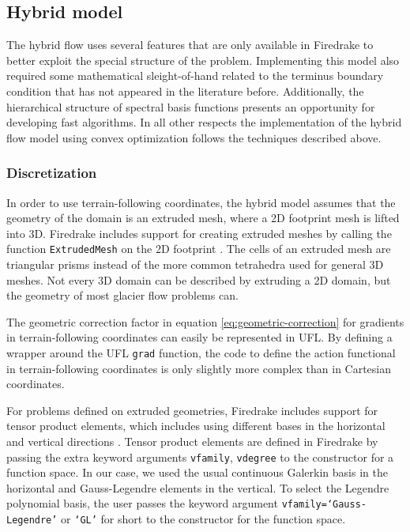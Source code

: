 \documentclass[journal abbreviation, manuscript]{copernicus}
\begin{document}
\subsection{Hybrid model}

The hybrid flow uses several features that are only available in Firedrake to better exploit the special structure of the problem.
Implementing this model also required some mathematical sleight-of-hand related to the terminus boundary condition that has not appeared in the literature before.
Additionally, the hierarchical structure of spectral basis functions presents an opportunity for developing fast algorithms.
In all other respects the implementation of the hybrid flow model using convex optimization follows the techniques described above.

\subsubsection{Discretization}

In order to use terrain-following coordinates, the hybrid model assumes that the geometry of the domain is an extruded mesh, where a 2D footprint mesh is lifted into 3D.
Firedrake includes support for creating extruded meshes by calling the function \texttt{ExtrudedMesh} on the 2D footprint \citep{bercea2016structure, mcrae2016automated}.
The cells of an extruded mesh are triangular prisms instead of the more common tetrahedra used for general 3D meshes.
Not every 3D domain can be described by extruding a 2D domain, but the geometry of most glacier flow problems can.

The geometric correction factor in equation \eqref{eq:geometric-correction} for gradients in terrain-following coordinates can easily be represented in UFL.
By defining a wrapper around the UFL \texttt{grad} function, the code to define the action functional in terrain-following coordinates is only slightly more complex than in Cartesian coordinates.

For problems defined on extruded geometries, Firedrake includes support for tensor product elements, which includes using different bases in the horizontal and vertical directions \citep{mcrae2016automated}.
Tensor product elements are defined in Firedrake by passing the extra keyword arguments \texttt{vfamily}, \texttt{vdegree} to the constructor for a function space.
In our case, we used the usual continuous Galerkin basis in the horizontal and Gauss-Legendre elements in the vertical.
To select the Legendre polynomial basis, the user passes the keyword argument \texttt{vfamily=`Gauss-Legendre'} or \texttt{`GL'} for short to the constructor for the function space.
\end{document}
